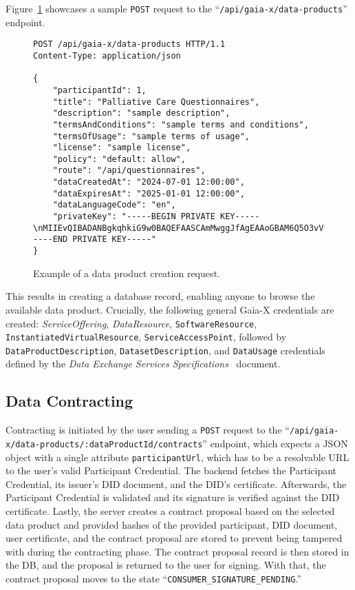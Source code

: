 Figure~\ref{fig:data_products_req} showcases a sample \texttt{POST} request to the ``\texttt{/api/gaia-x/data-products}'' endpoint.

\begin{figure}[h]
    \centering
    \begin{verbatim}
POST /api/gaia-x/data-products HTTP/1.1
Content-Type: application/json

{
	"participantId": 1,
	"title": "Palliative Care Questionnaires",
	"description": "sample description",
	"termsAndConditions": "sample terms and conditions",
	"termsOfUsage": "sample terms of usage",
	"license": "sample license",
	"policy": "default: allow",
	"route": "/api/questionnaires",
	"dataCreatedAt": "2024-07-01 12:00:00",
	"dataExpiresAt": "2025-01-01 12:00:00",
	"dataLanguageCode": "en",
	"privateKey": "-----BEGIN PRIVATE KEY-----\nMIIEvQIBADANBgkqhkiG9w0BAQEFAASCAmMwggJfAgEAAoGBAM6Q5O3vVfnxk6P7\n...\nYWw+HiFJh9XQpRUtv9PV8L8AqFFfMdsOpT6pgC+aA/WB\n-----END PRIVATE KEY-----"
}
    \end{verbatim}
    \caption{Example of a data product creation request.}\label{fig:data_products_req}
\end{figure}

This results in creating a database record, enabling anyone to browse the available data product.
Crucially, the following general Gaia-X credentials are created: \textit{ServiceOffering}, \textit{DataResource}, \texttt{SoftwareResource}, \texttt{InstantiatedVirtualResource}, \texttt{ServiceAccessPoint}, followed by \texttt{DataProductDescription}, \texttt{DatasetDescription}, and \texttt{DataUsage} credentials defined by the \textit{Data Exchange Services Specifications}~\cite{gaiax_data_exchange_document} document.

\subsection{Data Contracting}\label{subsec:data-contracting}

Contracting is initiated by the user sending a \texttt{POST} request to the ``\texttt{/api\-/gaia-x\-/data-products\-/:dataProductId\-/contracts}'' endpoint, which expects a JSON object with a single attribute \texttt{participantUrl}, which has to be a resolvable URL to the user's valid Participant Credential.
The backend fetches the Participant Credential, its issuer's DID document, and the DID's certificate.
Afterwards, the Participant Credential is validated and its signature is verified against the DID certificate.
Lastly, the server creates a contract proposal based on the selected data product and provided hashes of the provided participant, DID document, user certificate, and the contract proposal are stored to prevent being tampered with during the contracting phase.
The contract proposal record is then stored in the DB, and the proposal is returned to the user for signing.
With that, the contract proposal moves to the state ``\texttt{CONSUMER\_SIGNATURE\_PENDING}.''

